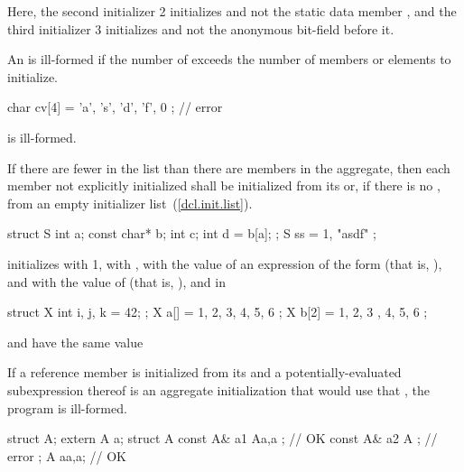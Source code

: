 Here, the second initializer 2 initializes
and not the static data member
, and the third initializer 3 initializes 
and not the anonymous bit-field before it.
\exitexample

\pnum
An
is ill-formed if the number of
exceeds the number of members or elements to initialize.
\enterexample

\begin{codeblock}
char cv[4] = { 'a', 's', 'd', 'f', 0 };     // error
\end{codeblock}

is ill-formed.
\exitexample

\pnum
If there are fewer  in the list than there
are members in the aggregate, then each member not explicitly initialized
shall be initialized from its  or,
if there is no , from an empty
initializer list~(\ref{dcl.init.list}).
\enterexample

\begin{codeblock}
struct S { int a; const char* b; int c; int d = b[a]; };
S ss = { 1, "asdf" };
\end{codeblock}

initializes
with 1,
with ,
with the value of an expression of the form
(that is, ), and  with the value of 
(that is, ), and in

\begin{codeblock}
struct X { int i, j, k = 42; };
X a[] = { 1, 2, 3, 4, 5, 6 };
X b[2] = { { 1, 2, 3 }, { 4, 5, 6 } };
\end{codeblock}

 and  have the same value
\exitexample

\pnum
If a reference member is initialized from its 
and a potentially-evaluated subexpression thereof is an aggregate
initialization that would use that ,
the program is ill-formed.
\enterexample
\begin{codeblock}
  struct A;
  extern A a;
  struct A {
    const A& a1 { A{a,a} };   // OK
    const A& a2 { A{} };      // error
  };
  A a{a,a};                   // OK
\end{codeblock}
\exitexample

